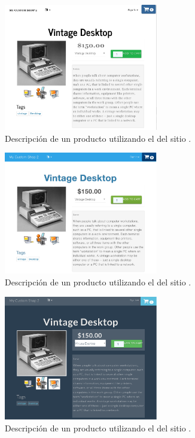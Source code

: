 	\begin{figure}[H]
		\centering
		\includegraphics[width=0.6\textwidth]{figuras/bootstrap/bootstrap_theme_journal.png}

		\caption{Descripción de un producto utilizando el \themeCPT \textbf{\themeJournal} del sitio \bootswatchNAME.}
		\label{figure:bootstrap:theme_journal}
	\end{figure}

	\begin{figure}[H]
		\centering
		\includegraphics[width=0.6\textwidth]{figuras/bootstrap/bootstrap_theme_cerulean.png}

		\caption{Descripción de un producto utilizando el \themeCPT \textbf{\themeCerulean} del sitio \bootswatchNAME.}
		\label{figure:bootstrap:theme_cerulean}
	\end{figure}

	\begin{figure}[H]
		\centering
		\includegraphics[width=0.6\textwidth]{figuras/bootstrap/bootstrap_theme_superhero.png}

		\caption{Descripción de un producto utilizando el \themeCPT \textbf{\themeSuperHero} del sitio \bootswatchNAME.}
		\label{figure:bootstrap:theme_superhero}
	\end{figure}

